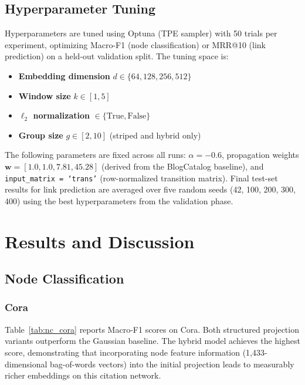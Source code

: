 \documentclass[conference]{IEEEtran}
\begin{document}
\subsection{Hyperparameter Tuning}

Hyperparameters are tuned using Optuna \cite{optuna} (TPE sampler) with 50
trials per experiment, optimizing Macro-F1 (node classification) or MRR@10
(link prediction) on a held-out validation split. The tuning space is:

\begin{itemize}
    \item \textbf{Embedding dimension} $d \in \{64, 128, 256, 512\}$
    \item \textbf{Window size} $k \in [1, 5]$
    \item \textbf{$\ell_2$ normalization} $\in \{\text{True}, \text{False}\}$
    \item \textbf{Group size} $g \in [2, 10]$ (striped and hybrid only)
\end{itemize}

The following parameters are fixed across all runs: $\alpha = -0.6$,
propagation weights $\mathbf{w} = [1.0, 1.0, 7.81, 45.28]$ (derived from
the BlogCatalog baseline), and \texttt{input\_matrix = `trans'} (row-normalized
transition matrix). Final test-set results for link prediction are averaged
over five random seeds (42, 100, 200, 300, 400) using the best
hyperparameters from the validation phase.

\section{Results and Discussion}
\label{sec:results}

\subsection{Node Classification}

\subsubsection{Cora}

Table~\ref{tab:nc_cora} reports Macro-F1 scores on Cora. Both structured
projection variants outperform the Gaussian baseline. The hybrid model
achieves the highest score, demonstrating that incorporating node feature
information (1,433-dimensional bag-of-words vectors) into the initial
projection leads to measurably richer embeddings on this citation network.
\end{document}

